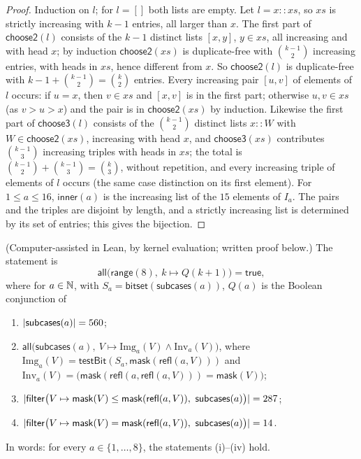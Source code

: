 \begin{proof}
Induction on $l$; for $l=[]$ both lists are empty. Let $l=x\mathbin{::}xs$, so $xs$ is strictly increasing with $k-1$
entries, all larger than $x$. The first part of $\mathsf{choose2}(l)$ consists of the $k-1$ distinct lists $[x,y]$,
$y\in xs$, all increasing and with head $x$; by induction $\mathsf{choose2}(xs)$ is duplicate-free with
$\binom{k-1}2$ increasing entries, with heads in $xs$, hence different from $x$. So $\mathsf{choose2}(l)$ is
duplicate-free with $k-1+\binom{k-1}2=\binom k2$ entries. Every increasing pair $[u,v]$ of elements of $l$ occurs: if
$u=x$, then $v\in xs$ and $[x,v]$ is in the first part; otherwise $u,v\in xs$ (as $v>u>x$) and the pair is in
$\mathsf{choose2}(xs)$ by induction. Likewise the first part of $\mathsf{choose3}(l)$ consists of the
$\binom{k-1}2$ distinct lists $x\mathbin{::}W$ with $W\in\mathsf{choose2}(xs)$, increasing with head $x$, and
$\mathsf{choose3}(xs)$ contributes $\binom{k-1}3$ increasing triples with heads in $xs$; the total is
$\binom{k-1}2+\binom{k-1}3=\binom k3$, without repetition, and every increasing triple of elements of $l$ occurs (the
same case distinction on its first element). For $1\le a\le16$, $\mathsf{inner}(a)$ is the increasing list of the
$15$ elements of $I_a$. The pairs and the triples are disjoint by length, and a strictly increasing list is determined
by its set of entries; this gives the bijection.
\end{proof}

\begin{theorem}\label{cb:thm:c2-refl}
(Computer-assisted in Lean, by kernel evaluation; written proof below.) The statement is
\[
\mathsf{all}\big(\mathsf{range}(8),\ k\mapsto Q(k+1)\big)=\mathsf{true},
\]
where for $a\in\mathbb N$, with $S_a=\mathsf{bitset}(\mathsf{subcases}(a))$, $Q(a)$ is the Boolean conjunction of
\begin{enumerate}[label=(\roman*)]
\item $\lvert\mathsf{subcases}(a)\rvert=560$;
\item $\mathsf{all}\big(\mathsf{subcases}(a),\ V\mapsto\mathrm{Img}_a(V)\wedge\mathrm{Inv}_a(V)\big)$, where
  $\mathrm{Img}_a(V)=\mathsf{testBit}(S_a,\mathsf{mask}(\mathsf{refl}(a,V)))$ and
  $\mathrm{Inv}_a(V)=\big(\mathsf{mask}(\mathsf{refl}(a,\mathsf{refl}(a,V)))=\mathsf{mask}(V)\big)$;
\item $\lvert\mathsf{filter}\big(V\mapsto\mathsf{mask}(V)\le\mathsf{mask}(\mathsf{refl}(a,V)),\
  \mathsf{subcases}(a)\big)\rvert=287$;
\item $\lvert\mathsf{filter}\big(V\mapsto\mathsf{mask}(V)=\mathsf{mask}(\mathsf{refl}(a,V)),\
  \mathsf{subcases}(a)\big)\rvert=14$.
\end{enumerate}
In words: for every $a\in\{1,\dots,8\}$, the statements (i)--(iv) hold.
\end{theorem}

